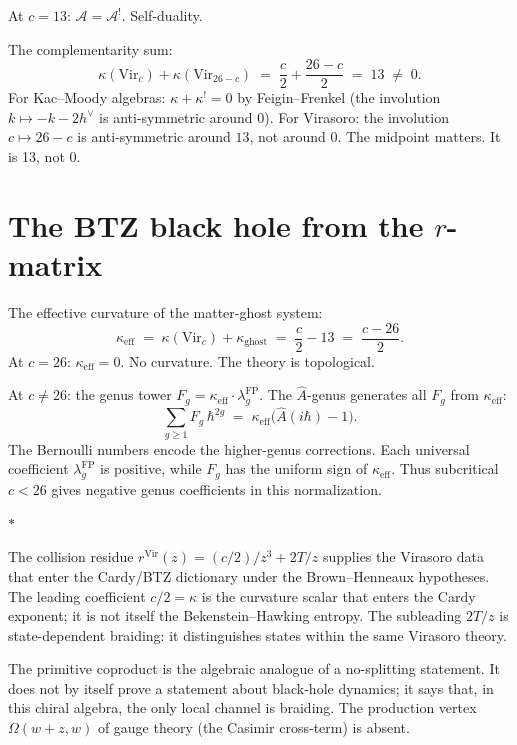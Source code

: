 \documentclass[11pt]{article}
\newcommand{\cA}{\mathcal{A}}
\newcommand{\sep}{\bigskip\begin{center}$*$\end{center}\medskip}
\begin{document}
At $c = 13$: $\cA = \cA^!$.  Self-duality.

\medskip

The complementarity sum:
\[
\kappa(\mathrm{Vir}_c) + \kappa(\mathrm{Vir}_{26-c})
\;=\; \frac{c}{2} + \frac{26-c}{2} \;=\; 13 \;\neq\; 0.
\]
For Kac--Moody algebras: $\kappa + \kappa^! = 0$ by
Feigin--Frenkel (the involution $k \mapsto -k-2h^\vee$ is
anti-symmetric around $0$).  For Virasoro: the involution
$c \mapsto 26-c$ is anti-symmetric around $13$, not around $0$.
The midpoint matters.  It is 13, not 0.


\section{The BTZ black hole from the $r$-matrix}
\label{sec:btz}

The effective curvature of the matter-ghost system:
\[
\kappa_{\mathrm{eff}}
\;=\;
\kappa(\mathrm{Vir}_c) + \kappa_{\mathrm{ghost}}
\;=\;
\frac{c}{2} - 13
\;=\;
\frac{c-26}{2}.
\]
At $c = 26$: $\kappa_{\mathrm{eff}} = 0$.  No curvature.
The theory is topological.

At $c \neq 26$: the genus tower
$F_g = \kappa_{\mathrm{eff}} \cdot \lambda_g^{\mathrm{FP}}$.
The $\hat{A}$-genus generates all $F_g$ from $\kappa_{\mathrm{eff}}$:
\[
\sum_{g \geq 1} F_g\,\hbar^{2g}
\;=\;
\kappa_{\mathrm{eff}}
\bigl(\hat{A}(i\hbar) - 1\bigr).
\]
The Bernoulli numbers encode the higher-genus corrections.  Each
universal coefficient $\lambda_g^{\mathrm{FP}}$ is positive, while
$F_g$ has the uniform sign of $\kappa_{\mathrm{eff}}$.  Thus
subcritical $c<26$ gives negative genus coefficients in this
normalization.

\sep

The collision residue
$r^{\mathrm{Vir}}(z) = (c/2)/z^3 + 2T/z$ supplies the Virasoro data
that enter the Cardy/BTZ dictionary under the Brown--Henneaux
hypotheses.  The leading coefficient $c/2 = \kappa$ is the curvature
scalar that enters the Cardy exponent; it is not itself the
Bekenstein--Hawking entropy.  The subleading $2T/z$ is
state-dependent braiding: it distinguishes states within the same
Virasoro theory.

The primitive coproduct is the algebraic analogue of a no-splitting
statement.  It does not by itself prove a statement about black-hole
dynamics; it says that, in this chiral algebra, the only local channel
is braiding.  The production vertex $\Omega(w{+}z,w)$ of gauge theory
(the Casimir cross-term) is absent.
\end{document}
